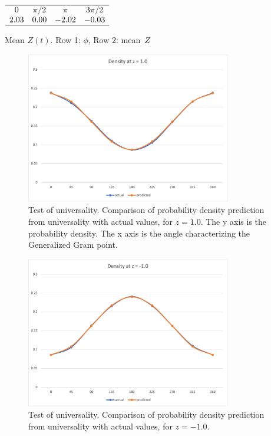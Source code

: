 \documentclass[twoside]{article}
\begin{document}
\begin{table}
\centering \(\begin{array}{cccccccccccc}

\hline
0     &\pi/2  &\pi  &3\pi/2  \\
2.03  &0.00  &-2.02 & -0.03  \\
\hline
\end{array}\)
\caption{Mean  $Z(t)$. Row 1: $\phi$, 
Row 2: mean~$Z$}
\label{tab:mean12}
\end{table}


\begin{figure}
\centering
\includegraphics[width=0.8\textwidth]{z1.jpg}
\caption[]{ 
 Test of universality. Comparison of probability density prediction from
 universality with actual values, for $z=1.0$. The y axis is the probability density.
 The x axis is the angle characterizing the Generalized Gram point.
  }
\vspace{1mm}
\label{z05}
\end{figure}

\begin{figure}
\centering
\includegraphics[width=0.8\textwidth]{z_1.jpg}
\caption[]{ 
 Test of universality. Comparison of probability density prediction from
 universality with actual values, for $z=-1.0$. 
  }
\vspace{1mm}
\label{z00}
\end{figure}
\end{document}
